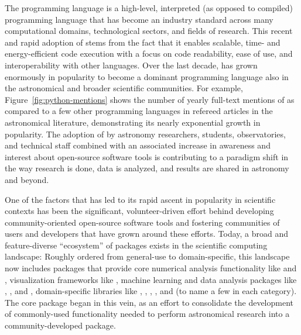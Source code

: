 \documentclass[modern]{aastex631}
\begin{document}
The \python programming language is a high-level, interpreted (as opposed to
compiled) programming language that has become an industry standard across many
computational domains, technological sectors, and fields of research.
This recent and rapid adoption of \python stems from the fact that it enables
scalable, time- and energy-efficient code execution \citep[e.g.,][]{Augier:2021}
with a focus on code readability, ease of use, and interoperability with other
languages.
Over the last decade, \python has grown enormously in popularity to become a
dominant programming language also in the astronomical and broader scientific
communities.
For example, Figure~\ref{fig:python-mentions} shows the number of yearly
full-text mentions of \python as compared to a few other programming languages
in refereed articles in the astronomical literature, demonstrating its nearly
exponential growth in popularity.
The adoption of \python by astronomy researchers, students, observatories, and
technical staff combined with an associated increase in awareness and interest
about open-source software tools is contributing to a paradigm shift in the way
research is done, data is analyzed, and results are shared in astronomy and
beyond.

One of the factors that has led to its rapid ascent in popularity in scientific
contexts has been the significant, volunteer-driven effort behind developing
community-oriented open-source software tools and fostering communities of users
and developers that have grown around these efforts.
Today, a broad and feature-diverse ``ecosystem'' of packages exists in the
\python scientific computing landscape: Roughly ordered from general-use to
domain-specific, this landscape now includes packages that provide core
numerical analysis functionality like  \citep{numpy:nature} and
 \citep{scipy}, visualization frameworks like
 \citep{matplotlib}, machine learning and data analysis
packages like  \citep{tensorflow}, 
\citep{Salvatier:2016}, and  \citep{emcee}, domain-specific
libraries like  \citep{yt:2011}, 
\citep{plasmapy},  \citep{sunpy:apj}, 
\citep{biopython}, and  \citep{sympy} (to name a few in each
category).
The \astropypkg \citep{astropy:2013, astropy:2018} core package began in this
vein, as an effort to consolidate the development of commonly-used functionality
needed to perform astronomical research into a community-developed \python
package.
\end{document}

